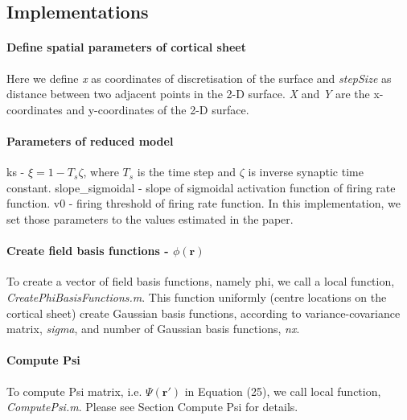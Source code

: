 \documentclass[a4paper, 12pt, english]{article}
\begin{document}
\subsection{Implementations}

\paragraph{Define spatial parameters of cortical sheet\newline}
Here we define \textit{x} as coordinates of discretisation of the surface and
\textit{stepSize} as distance between two adjacent points in the 2-D surface.
\textit{X} and \textit{Y} are the x-coordinates and y-coordinates of the 2-D surface.

\paragraph{Parameters of reduced model\newline}
ks - $\xi = 1 - T_s\zeta $, where $T_s$ is the time step and $\zeta $ is inverse synaptic time constant. \newline
slope\_sigmoidal - slope of sigmoidal activation function of firing rate function.\newline
v0 - firing threshold of firing rate function.\newline
In this implementation, we set those parameters to the values estimated in the paper.

\paragraph{Create field basis functions - $\phi(\boldsymbol{r}) $\newline}
To create a vector of field basis functions, namely phi, we call a local function,
\textit{CreatePhiBasisFunctions.m}. This function uniformly (centre locations on the cortical sheet)
create Gaussian basis functions, according to variance-covariance matrix, \textit{sigma},
and number of Gaussian basis functions, \textit{nx}.

\paragraph{Compute Psi\newline}
To compute Psi matrix, i.e. $\Psi(\boldsymbol{r\prime}) $ in Equation (25),
we call local function, \textit{ComputePsi.m}. Please see Section Compute Psi
for details.
\end{document}
